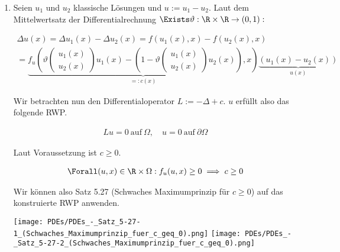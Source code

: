 \begin{solution}

\phantom{}

\begin{enumerate}[label = (\alph*)]

  \item Seien $u_1$ und $u_2$ klassische Lösungen und $u := u_1 - u_2$.
  Laut dem Mittelwertsatz der Differentialrechnung $\Exists \vartheta: \R \times \R \to (0, 1):$

  \begin{multline*}
    \Delta u(x)
    =
    \Delta u_1(x) - \Delta u_2(x)
    =
    f(u_1(x), x) - f(u_2(x), x) \\
    =
    \underbrace
    {
      f_u(\vartheta\begin{pmatrix}u_1(x) \\ u_2(x)\end{pmatrix} u_1(x) - (1 - \vartheta \begin{pmatrix}u_1(x) \\ u_2(x)\end{pmatrix} u_2(x)), x)
    }_{
      =: c(x)
    }
    \underbrace
    {
      (u_1(x) - u_2(x))
    }_{
      u(x)
    }
  \end{multline*}

  Wir betrachten nun den Differentialoperator $L := -\Delta + c$.
  $u$ erfüllt also das folgende RWP.

  \begin{align*}
    Lu = 0 ~\text{auf}~ \Omega,
    \quad
    u = 0 ~\text{auf}~ \partial \Omega
  \end{align*}

  Laut Voraussetzung ist $c \geq 0$.

  \begin{align*}
    \Forall (u, x) \in \R \times \Omega:
    f_u(u, x) \geq 0
    \implies
    c \geq 0
  \end{align*}

  Wir können also Satz 5.27 (Schwaches Maximumprinzip für $c \geq 0$) auf das konstruierte RWP anwenden.


  \begin{center}
    \texttt{[image: PDEs/PDEs\_-\_Satz\_5-27-1\_(Schwaches\_Maximumprinzip\_fuer\_c\_geq\_0).png]}
    \texttt{[image: PDEs/PDEs\_-\_Satz\_5-27-2\_(Schwaches\_Maximumprinzip\_fuer\_c\_geq\_0).png]}
  \end{center}


\end{enumerate}
\end{solution}
